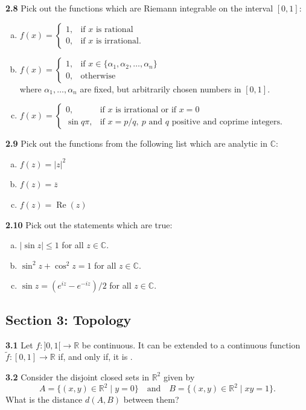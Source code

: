 \documentclass[11pt,a4paper]{article}
\newcommand{\R}{\mathbb{R}}
\newcommand{\C}{\mathbb{C}}
\newcommand{\RePart}{\operatorname{Re}}
\newcommand{\examsec}[1]{%
  \subsection*{#1}
  \vspace{-2pt}
}
\newcommand{\qitem}[1]{\par\medskip\noindent\textbf{#1}\hspace{0.5em}}
\begin{document}
\qitem{2.8} Pick out the functions which are Riemann integrable on the interval $[0, 1]$:
\begin{enumerate}[(a)]
  \item $f(x) = \begin{cases} 1, & \text{if } x \text{ is rational} \\ 0, & \text{if } x \text{ is irrational.} \end{cases}$
  \item $f(x) = \begin{cases} 1, & \text{if } x \in \{\alpha_1, \alpha_2, \ldots, \alpha_n\} \\ 0, & \text{otherwise} \end{cases}$\\
  where $\alpha_1, \ldots, \alpha_n$ are fixed, but arbitrarily chosen numbers in $[0, 1]$.
  \item $f(x) = \begin{cases} 0, & \text{if } x \text{ is irrational or if } x = 0 \\ \sin q\pi, & \text{if } x = p/q,\ p \text{ and } q \text{ positive and coprime integers.} \end{cases}$
\end{enumerate}

\qitem{2.9} Pick out the functions from the following list which are analytic in $\C$:
\begin{enumerate}[(a)]
  \item $f(z) = |z|^2$
  \item $f(z) = \overline{z}$
  \item $f(z) = \RePart(z)$
\end{enumerate}

\qitem{2.10} Pick out the statements which are true:
\begin{enumerate}[(a)]
  \item $|\sin z| \le 1$ for all $z \in \C$.
  \item $\sin^2 z + \cos^2 z = 1$ for all $z \in \C$.
  \item $\sin z = (e^{iz} - e^{-iz})/2$ for all $z \in \C$.
\end{enumerate}

\examsec{Section 3: Topology}

\qitem{3.1} Let $f : ]0, 1[ \to \R$ be continuous. It can be extended to a continuous function $\widetilde{f} : [0, 1] \to \R$ if, and only if, it is \underline{\hspace{3cm}}.

\qitem{3.2} Consider the disjoint closed sets in $\R^2$ given by
\[
  A = \{(x, y) \in \R^2 \mid y = 0\} \quad \text{and} \quad B = \{(x, y) \in \R^2 \mid xy = 1\}.
\]
What is the distance $d(A, B)$ between them?
\end{document}
